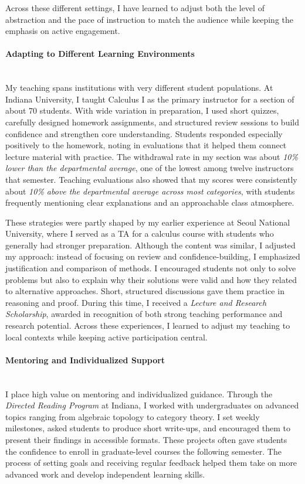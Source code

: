 \documentclass[11pt]{article}
\begin{document}
Across these different settings, I have learned to adjust both the level of abstraction and the pace of instruction to match the audience while keeping the emphasis on active engagement.

\paragraph{Adapting to Different Learning Environments} \quad \\
My teaching spans institutions with very different student populations.
At Indiana University, I taught Calculus I as the primary instructor for a section of about 70 students.
With wide variation in preparation, I used short quizzes, carefully designed homework assignments, and structured review sessions to build confidence and strengthen core understanding.
Students responded especially positively to the homework, noting in evaluations that it helped them connect lecture material with practice.
The withdrawal rate in my section was about \emph{10\% lower than the departmental average}, one of the lowest among twelve instructors that semester. Teaching evaluations also showed that my scores were consistently about \emph{10\% above the departmental average across most categories}, with students frequently mentioning clear explanations and an approachable class atmosphere.

These strategies were partly shaped by my earlier experience at Seoul National University, where I served as a TA for a calculus course with students who generally had stronger preparation. 
Although the content was similar, I adjusted my approach: instead of focusing on review and confidence-building, I emphasized justification and comparison of methods. 
I encouraged students not only to solve problems but also to explain why their solutions were valid and how they related to alternative approaches. 
Short, structured discussions gave them practice in reasoning and proof.
During this time, I received a \emph{Lecture and Research Scholarship}, awarded in recognition of both strong teaching performance and research potential.
Across these experiences, I learned to adjust my teaching to local contexts while keeping active participation central.


\paragraph{Mentoring and Individualized Support}\quad \\
I place high value on mentoring and individualized guidance.
Through the \emph{Directed Reading Program} at Indiana, I worked with undergraduates on advanced topics ranging from algebraic topology to category theory.
I set weekly milestones, asked students to produce short write-ups, and encouraged them to present their findings in accessible formats.
These projects often gave students the confidence to enroll in graduate-level courses the following semester.
The process of setting goals and receiving regular feedback helped them take on more advanced work and develop independent learning skills.
\end{document}
